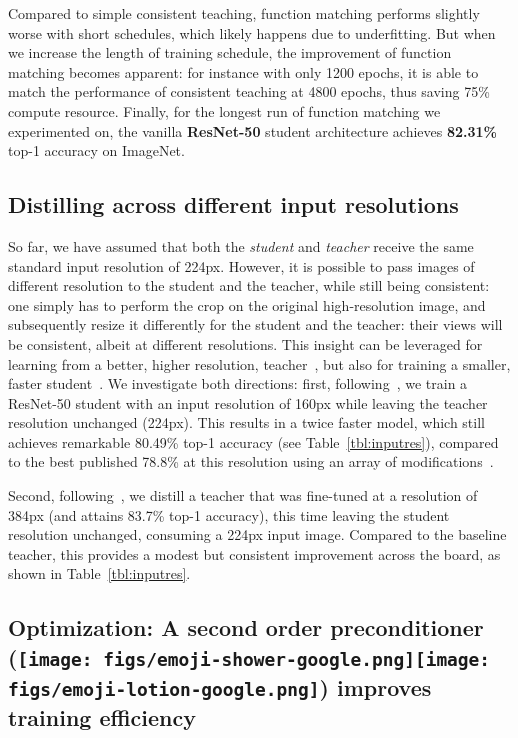 \documentclass[10pt,twocolumn,letterpaper]{article}
\def \shampoo {\texttt{[image: figs/emoji-shower-google.png]}\texttt{[image: figs/emoji-lotion-google.png]}\xspace}
\begin{document}
Compared to simple consistent teaching, function matching performs slightly worse with short schedules, which likely happens due to underfitting. But when we increase the length of training schedule, the improvement of function matching becomes apparent: for instance with only 1200 epochs, it is able to match the performance of consistent teaching at 4800 epochs, thus saving 75\% compute resource.
Finally, for the longest run of function matching we experimented on, the vanilla \textbf{ResNet-50}  student architecture achieves \textbf{82.31\%} top-1 accuracy on ImageNet. 

\subsection{Distilling across different input resolutions}

So far, we have assumed that both the \emph{student} and \emph{teacher} receive the same standard input resolution of 224px.
However, it is possible to pass images of different resolution to the student and the teacher, while still being consistent: one simply has to perform the crop on the original high-resolution image, and subsequently resize it differently for the student and the teacher: their views will be consistent, albeit at different resolutions.
This insight can be leveraged for learning from a better, higher resolution, teacher~\cite{brain2020bit,touvron2019FixRes}, but also for training a smaller, faster student~\cite{bello2021revisiting}.
We investigate both directions: first, following~\cite{bello2021revisiting}, we train a ResNet-50 student with an input resolution of 160px while leaving the teacher resolution unchanged (224px). 
This results in a twice faster model, which still achieves remarkable 80.49\% top-1 accuracy (see Table~\ref{tbl:inputres}), compared to the best published  78.8\% at this resolution using an array of modifications~\cite{bello2021revisiting}.

Second, following~\cite{brain2020bit}, we distill a teacher that was fine-tuned at a resolution of 384px (and attains 83.7\% top-1 accuracy), this time leaving the student resolution unchanged, \ie consuming a 224px input image.
Compared to the baseline teacher, this provides a modest but consistent
improvement across the board, as shown in Table~\ref{tbl:inputres}.

\subsection{Optimization: A second order preconditioner (\protect\shampoo) improves training efficiency}
\label{sec:limitations1}
\end{document}
